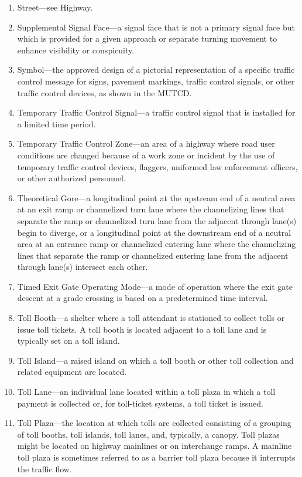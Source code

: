 \documentclass[9pt]{memoir}
\begin{document}
{\begin{enumerate}[label=\arabic*., ref=\arabic*]
\item Street---see Highway.
\item Supplemental Signal Face---a signal face that is not a primary signal face but which is provided for a given approach or separate turning movement to enhance visibility or conspicuity.
\item Symbol---the approved design of a pictorial representation of a specific traffic control message for signs, pavement markings, traffic control signals, or other traffic control devices, as shown in the MUTCD.
\item Temporary Traffic Control Signal---a traffic control signal that is installed for a limited time period.
\item Temporary Traffic Control Zone---an area of a highway where road user conditions are changed because of a work zone or incident by the use of temporary traffic control devices, flaggers, uniformed law enforcement officers, or other authorized personnel.
\item Theoretical Gore---a longitudinal point at the upstream end of a neutral area at an exit ramp or channelized turn lane where the channelizing lines that separate the ramp or channelized turn lane from the adjacent through lane(s) begin to diverge, or a longitudinal point at the downstream end of a neutral area at an entrance ramp or channelized entering lane where the channelizing lines that separate the ramp or channelized entering lane from the adjacent through lane(s) intersect each other.
\item Timed Exit Gate Operating Mode---a mode of operation where the exit gate descent at a grade crossing is based on a predetermined time interval.
\item Toll Booth---a shelter where a toll attendant is stationed to collect tolls or issue toll tickets. A toll booth is located adjacent to a toll lane and is typically set on a toll island.
\item Toll Island---a raised island on which a toll booth or other toll collection and related equipment are located.
\item Toll Lane---an individual lane located within a toll plaza in which a toll payment is collected or, for toll-ticket systems, a toll ticket is issued.
\item Toll Plaza---the location at which tolls are collected consisting of a grouping of toll booths, toll islands, toll lanes, and, typically, a canopy. Toll plazas might be located on highway mainlines or on interchange ramps. A mainline toll plaza is sometimes referred to as a barrier toll plaza because it interrupts the traffic flow.

\end{enumerate}}
\end{document}
